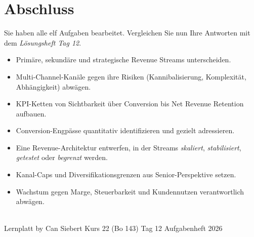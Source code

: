 \documentclass[11pt,a4paper,oneside]{article}
\begin{document}
\section*{Abschluss}
\thispagestyle{plain}

\noindent Sie haben alle elf Aufgaben bearbeitet. Vergleichen Sie nun Ihre Antworten mit dem \emph{Lösungsheft Tag 12}.

\medskip
\begin{infobox}
\begin{itemize}
  \item Primäre, sekundäre und strategische Revenue Streams unterscheiden.
  \item Multi-Channel-Kanäle gegen ihre Risiken (Kannibalisierung, Komplexität, Abhängigkeit) abwägen.
  \item KPI-Ketten von Sichtbarkeit über Conversion bis Net Revenue Retention aufbauen.
  \item Conversion-Engpässe quantitativ identifizieren und gezielt adressieren.
  \item Eine Revenue-Architektur entwerfen, in der Streams \emph{skaliert}, \emph{stabilisiert}, \emph{getestet} oder \emph{begrenzt} werden.
  \item Kanal-Caps und Diversifikationsgrenzen aus Senior-Perspektive setzen.
  \item Wachstum gegen Marge, Steuerbarkeit und Kundennutzen verantwortlich abwägen.
\end{itemize}
\end{infobox}

\vspace{1cm}
\noindent{\color{lpAccent}\rule{\linewidth}{0.6pt}}\\[4pt]
{\footnotesize\sffamily\color{lpGray}Lernplatt \textperiodcentered{} by Can Siebert \textperiodcentered{} Kurs 22 (Bo 143) \textperiodcentered{} Tag 12 \textperiodcentered{} Aufgabenheft \textperiodcentered{} \textcopyright{} 2026}
\end{document}
